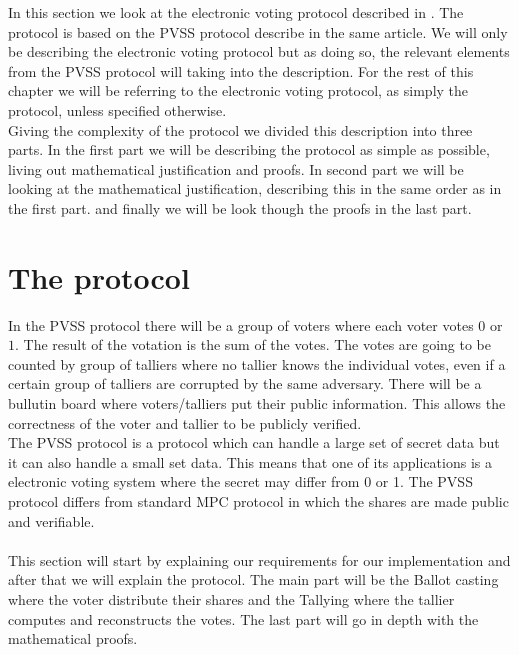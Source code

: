 In this section we look at the electronic voting protocol described in \cite{Schoenmakers1999}. The protocol is based on the PVSS protocol describe in the same article. We will only be describing the electronic voting protocol but as doing so, the relevant elements from the PVSS protocol will taking into the description. For the rest of this chapter we will be referring to the electronic voting protocol, as simply the protocol, unless specified otherwise. \\

\noindent
Giving the complexity of the protocol we divided this description into three parts. In the first part we will be describing the protocol as simple as possible, living out mathematical justification and proofs. In second part we will be looking at the mathematical justification, describing this in the same order as in the first part. and finally we will be look though the proofs in the last part. 


\section{The protocol}


\noindent
In the PVSS protocol there will be a group of voters where each voter votes $0$ or $1$. The result of the votation is the sum of the votes. The votes are going to be counted by group of talliers where no tallier knows the individual votes, even if a certain group of talliers are corrupted by the same adversary. There will be a bullutin board where voters/talliers put their public information. This allows the correctness of the voter and tallier to be publicly verified.\\

\noindent
The PVSS protocol is a protocol which can handle a large set of secret data but it can also handle a small set data. This means that one of its applications is a  electronic voting system where the secret may differ from 0 or 1. The PVSS protocol differs from standard MPC protocol in which the shares are made public and verifiable.\\\\
This section will start by explaining our requirements for our implementation and after that we will explain the protocol. The main part will be the Ballot casting where the voter distribute their shares and the Tallying where the tallier computes and reconstructs the votes. The last part will go in depth with the mathematical proofs. \\







